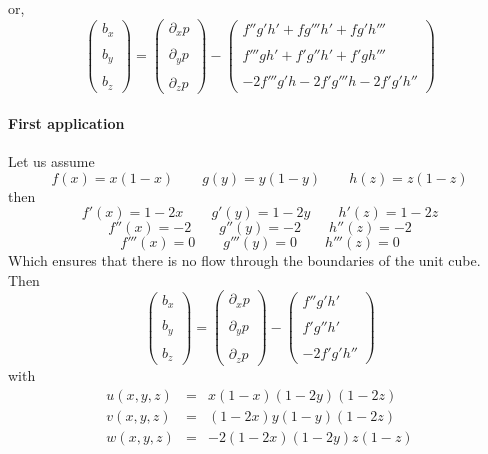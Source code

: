 or, 
\[
\left(
\begin{array}{c}
b_x \\ \\ b_y \\ \\ b_z
\end{array}
\right) 
=
\left(
\begin{array}{c}
\partial_x p \\ \\
\partial_y p \\ \\
\partial_z p 
\end{array}
\right) 
-
\left(
\begin{array}{c}
f''g' h'  + fg''' h'  +  fg'h'''   \\ \\
f''' g h' + f'g'' h'  +  f'gh'''  \\ \\
-2f''' g' h     -2f' g''' h -2f'g'h''
\end{array}
\right) 
\]

\paragraph{First application}


Let us assume 
\[
f(x)=x(1-x) \qquad
g(y)=y(1-y) \qquad
h(z)=z(1-z) 
\]
then 
\[
f'(x)=1-2x \qquad
g'(y)=1-2y \qquad
h'(z)=1-2z 
\]
\[
f''(x)=-2 \qquad
g''(y)=-2 \qquad
h''(z)=-2 
\]
\[
f'''(x)=0 \qquad
g'''(y)=0 \qquad
h'''(z)=0 
\]
Which ensures that there is no flow through the boundaries of the unit cube.
Then 
\[
\left(
\begin{array}{c}
b_x \\ \\ b_y \\ \\ b_z
\end{array}
\right) 
=
\left(
\begin{array}{c}
\partial_x p \\ \\
\partial_y p \\ \\
\partial_z p 
\end{array}
\right) 
-
\left(
\begin{array}{c}
f''g' h'     \\ \\
f'g'' h'    \\ \\
-2f'g'h''
\end{array}
\right) 
\]
with 
\begin{eqnarray}
u(x,y,z) &=& x(1-x)(1-2y)(1-2z)\\
v(x,y,z) &=& (1-2x) y(1-y) (1-2z) \\
w(x,y,z) &=& -2(1-2x)(1-2y)z(1-z)
\end{eqnarray}

